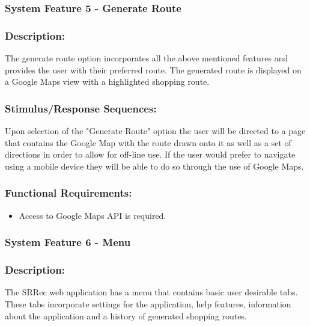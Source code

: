 \documentclass[10pt,twocolumn]{witseiepaper}
\begin{document}
		\subsubsection{System Feature 5 - Generate Route}
		
		\subsubsection*{Description:}
		
		The generate route option incorporates all the above mentioned features and provides the user with their preferred route. The generated route is displayed on a Google Maps view with a highlighted shopping route. 
		
		\subsubsection*{Stimulus/Response Sequences:}
		
		Upon selection of the "Generate Route" option the user will be directed to a page that contains the Google Map with the route drawn onto it as well as a set of directions in order to allow for off-line use. If the user would prefer to navigate using a mobile device they will be able to do so through the use of Google Maps.
		
		\subsubsection*{Functional Requirements:}
		
		\begin{itemize}
			\item Access to Google Maps API is required.
		\end{itemize}
		
		\subsubsection{System Feature 6 - Menu}
		
		\subsubsection*{Description:}
		
		The SRRec web application has a menu that contains basic user desirable tabs. These tabs incorporate settings for the application, help features, information about the application and a history of generated shopping routes. 
		
\end{document}
